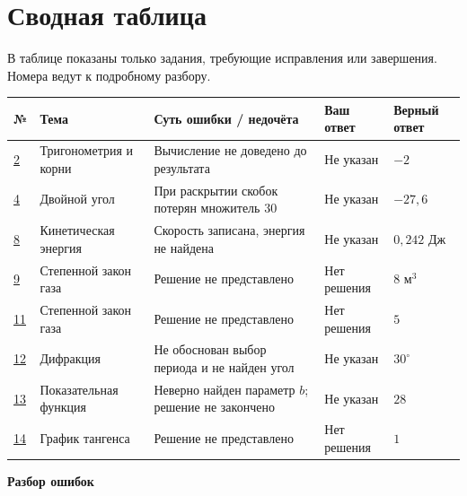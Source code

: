 \documentclass[a4paper,11pt]{article}
\begin{document}
\section*{Сводная таблица}
В таблице показаны только задания, требующие исправления или завершения. Номера ведут к подробному разбору.\par
\vspace{5mm}\noindent
{\small
\setlength{\tabcolsep}{2.2pt}
\renewcommand{\arraystretch}{1.28}
\begin{tabular}{@{}>{\centering\arraybackslash}p{9mm} >{\raggedright\arraybackslash}p{31mm} >{\raggedright\arraybackslash}p{58mm} >{\raggedright\arraybackslash}p{28mm} >{\raggedright\arraybackslash}p{26mm}@{}}
\toprule
\textbf{№} & \textbf{Тема} & \textbf{Суть ошибки / недочёта} & \textbf{Ваш ответ} & \textbf{Верный ответ}\\
\midrule
\hyperref[task:2]{2} & Тригонометрия и корни & Вычисление не доведено до результата & Не указан & $-2$\\
\hyperref[task:4]{4} & Двойной угол & При раскрытии скобок потерян множитель $30$ & Не указан & $-27{,}6$\\
\hyperref[task:8]{8} & Кинетическая энергия & Скорость записана, энергия не найдена & Не указан & $0{,}242$ Дж\\
\hyperref[task:9]{9} & Степенной закон газа & Решение не представлено & Нет решения & $8$ м$^3$\\
\hyperref[task:11]{11} & Степенной закон газа & Решение не представлено & Нет решения & $5$\\
\hyperref[task:12]{12} & Дифракция & Не обоснован выбор периода и не найден угол & Не указан & $30^\circ$\\
\hyperref[task:13]{13} & Показательная функция & Неверно найден параметр $b$; решение не закончено & Не указан & $28$\\
\hyperref[task:14]{14} & График тангенса & Решение не представлено & Нет решения & $1$\\
\bottomrule
\end{tabular}
}
\clearpage
\thispagestyle{empty}
\vspace*{0.37\textheight}
\begin{center}
{\Huge\bfseries\color{darkaccent}Разбор ошибок}
\end{center}
\end{document}

